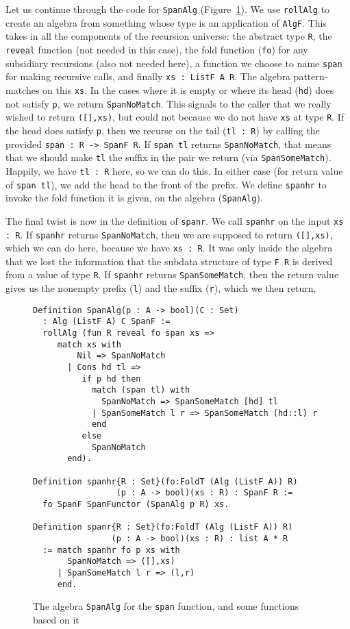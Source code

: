 \documentclass[a4paper,USenglish]{lipics-v2021}
\begin{document}
Let us continue through the code for \verb|SpanAlg|
(Figure~\ref{fig:span}).  We use \verb|rollAlg| to create an algebra
from something whose type is an application of \verb|AlgF|.  This
takes in all the components of the recursion universe: the abstract
type \verb|R|, the \verb|reveal| function (not needed in this case),
the fold function (\verb|fo|) for any subsidiary recursions (also not
needed here), a function we choose to name \verb|span| for making
recursive calls, and finally \verb|xs : ListF A R|.  The algebra
pattern-matches on this \verb|xs|.  In the cases where it is empty or
where its head (\verb|hd|) does not satisfy \verb|p|, we return
\verb|SpanNoMatch|.  This signals to the caller that we really wished
to return \verb|([],xs)|, but could not because we do not have
\verb|xs| at type \verb|R|.  If the head does satisfy \verb|p|, then
we recurse on the tail (\verb|tl : R|) by calling the provided \verb|span : R -> SpanF R|.
If \verb|span tl|
returns \verb|SpanNoMatch|, that means that we should make \verb|tl|
the suffix in the pair we return (via \verb|SpanSomeMatch|).  Happily,
we have \verb|tl : R| here, so we can do this.  In either case (for
return value of \verb|span tl|), we add the head to the front of the
prefix.  We define \verb|spanhr| to invoke the fold function it is
given, on the algebra (\verb|SpanAlg|).

The final twist is now in the definition of \verb|spanr|.  We call
\verb|spanhr| on the input \verb|xs : R|.  If \verb|spanhr| returns
\verb|SpanNoMatch|, then we are supposed to return \verb|([],xs)|,
which we can do here, because we have \verb|xs : R|.  It was only
inside the algebra that we lost the information that the subdata
structure of type \verb|F R| is derived from a value of type \verb|R|.
If \verb|spanhr| returns \verb|SpanSomeMatch|, then the return value
gives us the nonempty prefix (\verb|l|) and the suffix (\verb|r|), which we then return.

\begin{figure}
\begin{verbatim}
Definition SpanAlg(p : A -> bool)(C : Set)
  : Alg (ListF A) C SpanF :=
  rollAlg (fun R reveal fo span xs => 
     match xs with
         Nil => SpanNoMatch 
       | Cons hd tl =>
          if p hd then
            match (span tl) with
              SpanNoMatch => SpanSomeMatch [hd] tl
            | SpanSomeMatch l r => SpanSomeMatch (hd::l) r
            end
          else
            SpanNoMatch 
       end).

Definition spanhr{R : Set}(fo:FoldT (Alg (ListF A)) R)
                 (p : A -> bool)(xs : R) : SpanF R :=
  fo SpanF SpanFunctor (SpanAlg p R) xs.

Definition spanr{R : Set}(fo:FoldT (Alg (ListF A)) R)
                (p : A -> bool)(xs : R) : list A * R
  := match spanhr fo p xs with
       SpanNoMatch => ([],xs)
     | SpanSomeMatch l r => (l,r)
     end.
\end{verbatim}
\caption{The algebra \texttt{SpanAlg} for the \texttt{span} function, and some functions based on it}
\label{fig:span}
\end{figure}
\end{document}
